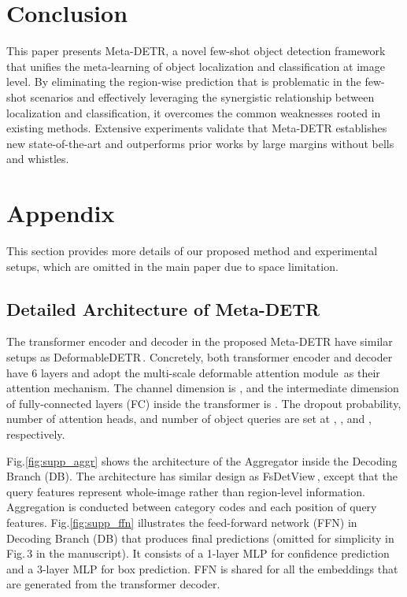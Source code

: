 \documentclass[10pt,twocolumn,letterpaper]{article}
\begin{document}
\vspace*{+0.8mm}
\section{Conclusion}
\vspace*{+0.50mm}
This paper presents Meta-DETR, a novel few-shot object detection framework that unifies the meta-learning of object localization and classification at image level. By eliminating the region-wise prediction that is problematic in the few-shot scenarios and effectively leveraging the synergistic relationship between localization and classification, it overcomes the common weaknesses rooted in existing methods. Extensive experiments validate that Meta-DETR establishes new state-of-the-art and outperforms prior works by large margins without bells and whistles.


\clearpage
{\small


}

\clearpage

\section{Appendix}

This section provides more details of our proposed method and experimental setups, which are omitted in the main paper due to space limitation. 

\subsection{Detailed Architecture of Meta-DETR}

The transformer encoder and decoder in the proposed Meta-DETR have similar setups as Deformable\;DETR\,\cite{DeformableDETR}. Concretely, both transformer encoder and decoder have 6 layers and adopt the multi-scale deformable attention module\,\cite{DeformableDETR} as their attention mechanism. The channel dimension is , and the intermediate dimension of fully-connected layers (FC) inside the transformer is . The dropout probability, number of attention heads, and number of object queries are set at , , and , respectively.

Fig.\;\ref{fig:supp_aggr} shows the architecture of the Aggregator inside the Decoding Branch (DB). The architecture has similar design as FsDetView\,\cite{FSDetView}, except that the query features represent whole-image rather than region-level information. Aggregation is conducted between category codes and each position of query features. Fig.\;\ref{fig:supp_ffn} illustrates the feed-forward network (FFN) in Decoding Branch (DB) that produces final predictions (omitted for simplicity in Fig.\,3 in the manuscript). It consists of a 1-layer MLP for confidence prediction and a 3-layer MLP for box prediction. FFN is shared for all the embeddings that are generated from the transformer decoder.
\end{document}
